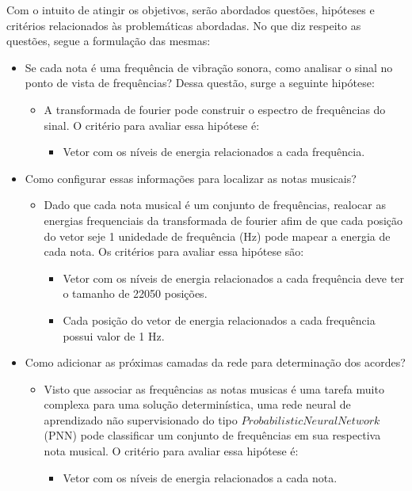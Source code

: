 Com o intuito de atingir os objetivos, serão abordados questões, hipóteses e critérios relacionados às problemáticas abordadas. No que diz respeito as questões, segue a formulação das mesmas:
\begin{itemize}
	\item Se cada nota é uma frequência de vibração sonora, como analisar o sinal no ponto de vista de frequências? Dessa questão, surge a seguinte hipótese:
	\begin{itemize}
		\item A transformada de fourier pode construir o espectro de frequências do sinal. O critério para avaliar essa hipótese é:
			\begin{itemize}
				\item Vetor com os níveis de energia relacionados a cada frequência.		
			\end{itemize}
	\end{itemize}

	\item Como configurar essas informações para localizar as notas musicais?
	\begin{itemize}
		\item Dado que cada nota musical é um conjunto de frequências, realocar as energias frequenciais da transformada de fourier afim de que cada posição do vetor seje 1 unidedade de frequência (Hz) pode mapear a energia de cada nota. Os critérios para avaliar essa hipótese são:
			\begin{itemize}
				\item Vetor com os níveis de energia relacionados a cada frequência deve ter o tamanho de 22050 posições.
				\item Cada posição do vetor de energia relacionados a cada frequência possui valor de 1 Hz.		
			\end{itemize}
	\end{itemize}

	\item Como adicionar as próximas camadas da rede para determinação dos acordes?
	\begin{itemize}
		\item  Visto que associar as frequências as notas musicas é uma tarefa muito complexa para uma solução determinística, uma rede neural de aprendizado não supervisionado do tipo $Probabilistic Neural Network$ (PNN) pode classificar um conjunto de frequências em sua respectiva nota musical. O critério para avaliar essa hipótese é:
			\begin{itemize}
				\item Vetor com os níveis de energia relacionados a cada nota.		
			\end{itemize}
	\end{itemize}
	

\end{itemize}
